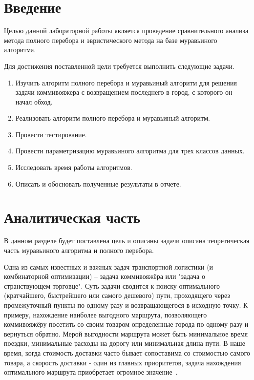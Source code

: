 \documentclass[a4paper,oneside,14pt]{extreport}
\begin{document}

\newpage
\tableofcontents
{}

\newpage

\chapter*{Введение}

Целью данной лабораторной работы является проведение сравнительного анализа метода полного перебора и эвристического метода на базе муравьиного алгоритма.

Для достижения поставленной цели требуется выполнить следующие задачи.
\begin{enumerate}
	\item Изучить алгоритм полного перебора и муравьиный алгоритм для решения задачи коммивояжера с возвращением последнего в город, с которого он начал обход.
	
	\item Реализовать алгоритм полного перебора и муравьиный алгоритм.
	
	\item Провести тестирование.
	
	\item Провести параметризацию муравьиного алгоритма для трех классов данных.
	
	\item Исследовать время работы алгоритмов.
	
	\item Описать и обосновать полученные результаты в отчете.
\end{enumerate}
\newpage

\chapter{Аналитическая часть}	
В данном разделе будет поставлена цель и описаны задачи описана теоретическая часть муравьиного алгоритма и полного перебора.

Одна из самых известных и важных задач транспортной логистики (и комбинаторной оптимизации) – задача коммивояжёра или "задача о странствующем торговце". Суть задачи сводится к поиску оптимального (кратчайшего, быстрейшего или самого дешевого) пути, проходящего через промежуточный пункты по одному разу и возвращающегося в исходную точку. К примеру, нахождение наиболее выгодного маршрута, позволяющего коммивояжёру посетить со своим товаром определенные города по одному разу и вернуться обратно. Мерой выгодности маршрута может быть минимальное время поездки, минимальные расходы на дорогу или минимальная длина пути. В наше время, когда стоимость доставки часто бывает сопоставима со стоимостью самого товара, а скорость доставки - один из главных приоритетов, задача нахождения оптимального маршрута приобретает огромное значение~\cite{1}.
\end{document}
